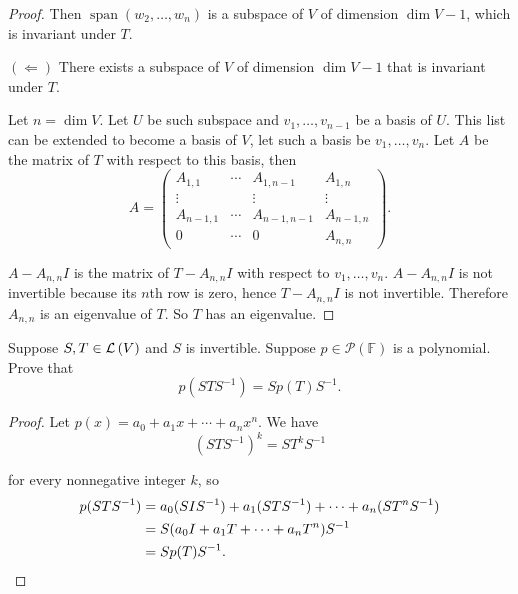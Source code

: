 \begin{proof}
    Then $\operatorname{span}(w_{2}, \ldots, w_{n})$ is a subspace of $V$ of dimension $\dim V - 1$, which is invariant under $T$.

    $(\Leftarrow)$ There exists a subspace of $V$ of dimension $\dim V - 1$ that is invariant under $T$.

    Let $n = \dim V$. Let $U$ be such subspace and $v_{1}, \ldots, v_{n-1}$ be a basis of $U$. This list can be extended to become a basis of $V$, let such a basis be $v_{1}, \ldots, v_{n}$. Let $A$ be the matrix of $T$ with respect to this basis, then
    \[
        A = \begin{pmatrix}
            A_{1,1}   & \cdots & A_{1,n-1}   & A_{1,n}   \\
            \vdots    &        & \vdots      & \vdots    \\
            A_{n-1,1} & \cdots & A_{n-1,n-1} & A_{n-1,n} \\
            0         & \cdots & 0           & A_{n,n}
        \end{pmatrix}.
    \]

    $A - A_{n,n}I$ is the matrix of $T - A_{n,n}I$ with respect to $v_{1}, \ldots, v_{n}$. $A - A_{n,n}I$ is not invertible because its $n$th row is zero, hence $T - A_{n,n}I$ is not invertible. Therefore $A_{n,n}$ is an eigenvalue of $T$. So $T$ has an eigenvalue.
\end{proof}
\newpage

\begin{exercise}
    Suppose $S,T\in\mathcal{L}\left({V}\right)$ and $S$ is invertible. Suppose $p\in\mathscr{P}(\mathbb{F})$ is a polynomial. Prove that
    \[
        p(STS^{-1}) = Sp(T)S^{-1}.
    \]
\end{exercise}

\begin{proof}
    Let $p(x) = a_{0} + a_{1}x + \cdots + a_{n}x^{n}$. We have
    \[
        {(STS^{-1})}^{k} = ST^{k}S^{-1}
    \]

    for every nonnegative integer $k$, so
    \begin{align*}
        p(STS^{-1}) & = a_{0}(SIS^{-1}) + a_{1}(STS^{-1}) + \cdots + a_{n}(ST^{n}S^{-1}) \\
                    & = S(a_{0}I + a_{1}T + \cdots + a_{n}T^{n})S^{-1}                   \\
                    & = Sp(T)S^{-1}.\qedhere
    \end{align*}
\end{proof}
\newpage


